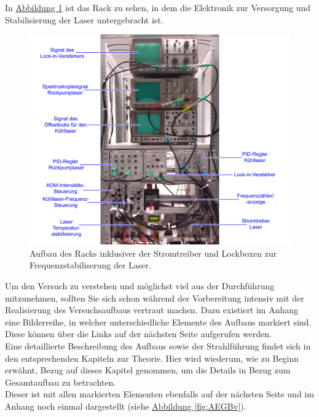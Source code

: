 \documentclass[
class=book,
accentcolor=1b,
custommargins=geometry,
fontsize=11pt,
thesis={type=Versuchsanleitung},
ruledheaders=all,
headline=false,
instbox=false,
marginpar=false,
title=small,
ignore-missing-data=true,
twoside=false,
logofile=apqdesign/tuda_logo.pdf,
pdfa=false %
]{apqpub}
\begin{document}
In \hyperref[fig:Rack]{Abbildung \ref{fig:Rack}} ist das Rack zu sehen, in dem die Elektronik zur Versorgung und Stabilisierung der Laser untergebracht ist.
\begin{figure}[htb!]
	\centering
	\includegraphics[width=\textwidth]{graphics/Rack2.jpg}
	\caption{Aufbau des Racks inklusiver der Stromtreiber und Lockboxen zur Frequenzstabiliserung der Laser.}
	\label{fig:Rack}
\end{figure} 

Um den Versuch zu verstehen und möglichst viel aus der Durchführung mitzunehmen, sollten Sie sich schon während der Vorbereitung intensiv mit der Realisierung des Versuchsaufbaus vertraut machen. 
Dazu existiert im Anhang eine Bilderreihe, in welcher unterschiedliche Elemente des Aufbaus markiert sind. 
Diese können über die Links auf der nächsten Seite aufgerufen werden.\\
Eine detaillierte Beschreibung des Aufbaus sowie der Strahlführung findet sich in den entsprechenden Kapiteln zur Theorie. 
Hier wird wiederum, wie zu Beginn erwähnt, Bezug auf dieses Kapitel genommen, um die Details in Bezug zum Gesamtaufbau zu betrachten.\\
Dieser ist mit allen markierten Elementen ebenfalls auf der nächsten Seite und im Anhang noch einmal dargestellt (siehe \hyperref[fig:AEGBv]{Abbildung \ref{fig:AEGBv}}).\\
\end{document}
